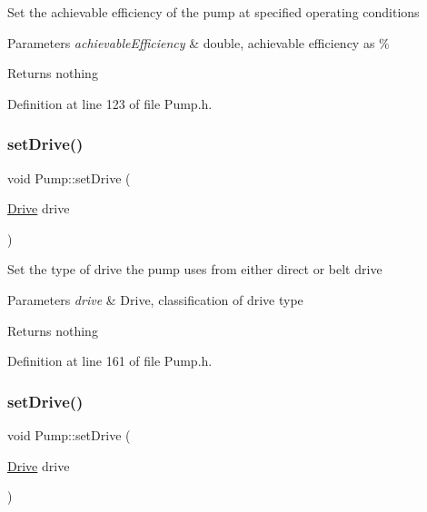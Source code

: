 Set the achievable efficiency of the pump at specified operating conditions


\begin{DoxyParams}{Parameters}
{\em achievable\+Efficiency} & double, achievable efficiency as \%\\
\hline
\end{DoxyParams}
\begin{DoxyReturn}{Returns}
nothing 
\end{DoxyReturn}


Definition at line 123 of file Pump.\+h.

\mbox{\label{class_pump_a54b6fc1aa44cc8377914ccb94738723a}} 
\subsubsection{\texorpdfstring{set\+Drive()}{setDrive()}\hspace{0.1cm}{\footnotesize\ttfamily [1/3]}}
{\footnotesize\ttfamily void Pump\+::set\+Drive (\begin{DoxyParamCaption}\item[{\hyperlink{class_pump_a32bf0ade131a11bb3b3fb374f638e983}{Drive}}]{drive }\end{DoxyParamCaption})\hspace{0.3cm}{\ttfamily [inline]}}

Set the type of drive the pump uses from either direct or belt drive


\begin{DoxyParams}{Parameters}
{\em drive} & Drive, classification of drive type\\
\hline
\end{DoxyParams}
\begin{DoxyReturn}{Returns}
nothing 
\end{DoxyReturn}


Definition at line 161 of file Pump.\+h.

\mbox{\label{class_pump_a54b6fc1aa44cc8377914ccb94738723a}} 
\subsubsection{\texorpdfstring{set\+Drive()}{setDrive()}\hspace{0.1cm}{\footnotesize\ttfamily [2/3]}}
{\footnotesize\ttfamily void Pump\+::set\+Drive (\begin{DoxyParamCaption}\item[{\hyperlink{class_pump_a32bf0ade131a11bb3b3fb374f638e983}{Drive}}]{drive }\end{DoxyParamCaption})\hspace{0.3cm}{\ttfamily [inline]}}

